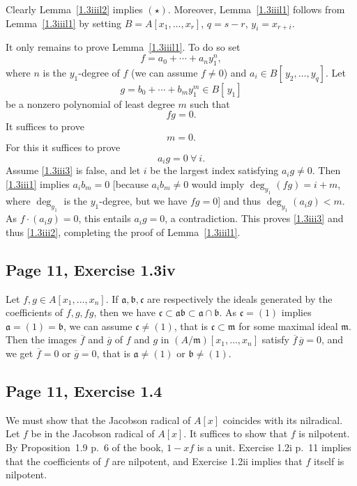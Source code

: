 \documentclass[parskip=half,fontsize=12pt]{scrartcl}%
\newcommand{\mf}{\mathfrak}
\newcommand{\aaa}{\mf a}
\newcommand{\bbb}{\mf b}
\newcommand{\ccc}{\mf c}
\newcommand{\mmm}{\mf m}
\begin{document}
Clearly Lemma~\ref{1.3iiil2} implies $(\star)$. Moreover, Lemma~\ref{1.3iiil1} follows from Lemma~\ref{1.3iiil1} by setting $B=A[x_1,\ldots,x_r]$, $q=s-r$, $y_i=x_{r+i}$.

It only remains to prove Lemma~\ref{1.3iiil1}. To do so set 
$$
f=a_0+\cdots+a_n y_1^n,
$$ 
where $n$ is the $y_1$-degree of $f$ (we can assume $f\ne0$) and $a_i\in B[\,y_2,\ldots,y_q]$. Let 
$$
g=b_0+\cdots+b_m y_1^m\in B[\,y_1]
$$ 
be a nonzero polynomial of least degree $m$ such that 
\begin{equation}\label{1.3iii1}
fg=0.
\end{equation}
It suffices to prove 
\begin{equation}\label{1.3iii2}
m=0.
\end{equation}
For this it suffices to prove
\begin{equation}\label{1.3iii3}
a_i g=0\ \forall\ i.
\end{equation}
Assume \eqref{1.3iii3} is false, and let $i$ be the largest index satisfying $a_i g\ne0$. Then \eqref{1.3iii1} implies $a_i b_m=0$ [because $a_i b_m\ne0$ would imply $\deg_{y_1}(fg)=i+m$, where $\deg_{y_1}$ is the $y_1$-degree, but we have $fg=0$] and thus $\deg_{y_1}(a_i g)<m$. As $f\cdot(a_i g)=0$, this entails $a_i g=0$, a contradiction. This proves \eqref{1.3iii3} and thus \eqref{1.3iii2}, completing the proof of Lemma~\ref{1.3iiil1}. 

\subsection{Page 11, Exercise 1.3iv}%

Let $f,g\in A[x_1,\ldots,x_n]$. If $\aaa,\bbb,\ccc$ are respectively the ideals generated by the coefficients of $f,g,fg$, then we have $\ccc\subset\aaa\bbb\subset\aaa\cap\bbb$. As $\ccc=(1)$ implies $\aaa=(1)=\bbb$, we can assume $\ccc\ne(1)$, that is $\ccc\subset\mmm$ for some maximal ideal $\mmm$. Then the images $\overline f$ and $\overline g$ of $f$ and $g$ in $(A/\mmm)[x_1,\ldots,x_n]$ satisfy $\overline f\,\overline g=0$, and we get $\overline f=0$ or $\overline g=0$, that is $\aaa\ne(1)$ or $\bbb\ne(1)$.

\subsection{Page 11, Exercise 1.4}%

We must show that the Jacobson radical of $A[x]$ coincides with its nilradical. Let $f$ be in the Jacobson radical of $A[x]$. It suffices to show that $f$ is nilpotent. By Proposition~1.9 p.~6 of the book, $1-xf$ is a unit. Exercise 1.2i p.~11 implies that the coefficients of $f$ are nilpotent, and Exercise 1.2ii implies that $f$ itself is nilpotent.
\end{document}
